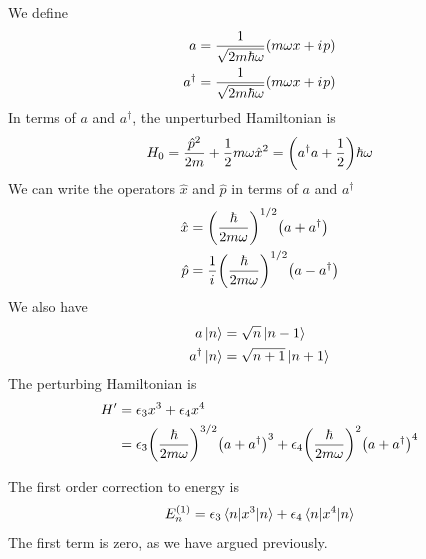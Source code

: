 \begin{enumerate}[label=Problem.\arabic*,start=1]
			We define
			\begin{align}
				a &= \frac{1}{\sqrt{2 m \hbar \omega}} \qty(m \omega x + {i\mkern1mu} p) \\
				a^\dagger &= \frac{1}{\sqrt{2 m \hbar \omega}} \qty(m \omega x + {i\mkern1mu} p)
			\end{align}
			In terms of $a$ and $a^\dagger$, the unperturbed Hamiltonian is 
			\begin{equation}
				H_0 = \frac{\hat{p}^2}{2 m} + \frac{1}{2} m \omega \hat{x}^2 = \qty(a^\dagger a + \frac{1}{2}) \hbar \omega
			\end{equation}
			We can write the operators $\hat{x}$ and $\hat{p}$ in terms of $a$ and $a^\dagger$
			\begin{align}
				\hat{x} &= \qty(\frac{\hbar}{2 m \omega})^{1/2} \qty(a + a^\dagger)\\
				\hat{p} &= \frac{1}{{i\mkern1mu}}\qty(\frac{\hbar}{2 m \omega})^{1/2} \qty(a - a^\dagger)
			\end{align}
			We also have
			\begin{align}
				a\ket{n} &= \sqrt{n} \ket{n - 1} \\
				a^\dagger \ket{n} &= \sqrt{n+1} \ket{n+1}
			\end{align}
			The perturbing Hamiltonian is
			\begin{align}
				H^\prime 
				&= \epsilon_3 x^3 + \epsilon_4 x^4 \\
				&= \epsilon_3 \qty(\frac{\hbar}{2 m \omega})^{3/2} \qty(a + a^\dagger)^3 + \epsilon_4 \qty(\frac{\hbar}{2 m \omega})^2 \qty(a + a^\dagger)^4
			\end{align}
			
			The first order correction to energy is 
			\begin{equation}
				E_n^{(1)} = \epsilon_3 \expval{x^3}{n} + \epsilon_4 \expval{x^4}{n}
			\end{equation}
			The first term is zero, as we have argued previously. 
			

\end{enumerate}
